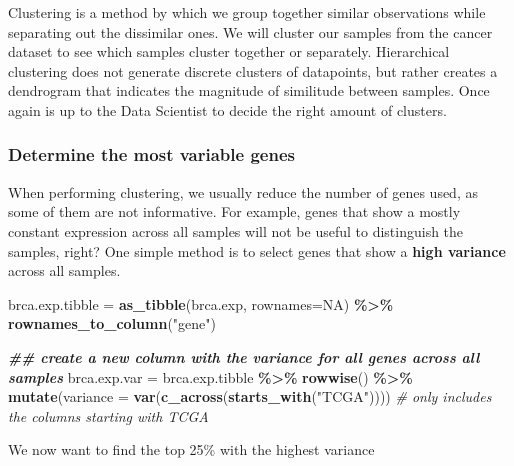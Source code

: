 \documentclass[
]{book}
\newenvironment{Shaded}{\begin{snugshade}}{\end{snugshade}}
\newcommand{\AttributeTok}[1]{\textcolor[rgb]{0.13,0.29,0.53}{#1}}
\newcommand{\CommentTok}[1]{\textcolor[rgb]{0.56,0.35,0.01}{\textit{#1}}}
\newcommand{\ConstantTok}[1]{\textcolor[rgb]{0.56,0.35,0.01}{#1}}
\newcommand{\DocumentationTok}[1]{\textcolor[rgb]{0.56,0.35,0.01}{\textbf{\textit{#1}}}}
\newcommand{\FloatTok}[1]{\textcolor[rgb]{0.00,0.00,0.81}{#1}}
\newcommand{\FunctionTok}[1]{\textcolor[rgb]{0.13,0.29,0.53}{\textbf{#1}}}
\newcommand{\NormalTok}[1]{#1}
\newcommand{\OtherTok}[1]{\textcolor[rgb]{0.56,0.35,0.01}{#1}}
\newcommand{\SpecialCharTok}[1]{\textcolor[rgb]{0.81,0.36,0.00}{\textbf{#1}}}
\newcommand{\StringTok}[1]{\textcolor[rgb]{0.31,0.60,0.02}{#1}}
\begin{document}
Clustering is a method by which we group together similar observations while separating out the dissimilar ones. We will cluster our samples from the cancer dataset to see which samples cluster together or separately. Hierarchical clustering does not generate discrete clusters of datapoints, but rather creates a dendrogram that indicates the magnitude of similitude between samples. Once again is up to the Data Scientist to decide the right amount of clusters.

\hypertarget{determine-the-most-variable-genes}{%
\subsubsection{Determine the most variable genes}\label{determine-the-most-variable-genes}}

When performing clustering, we usually reduce the number of genes used, as some of them are not informative. For example, genes that show a mostly constant expression across all samples will not be useful to distinguish the samples, right? One simple method is to select genes that show a \textbf{high variance} across all samples.

\begin{Shaded}
\begin{Highlighting}[]
\NormalTok{brca.exp.tibble }\OtherTok{=} \FunctionTok{as\_tibble}\NormalTok{(brca.exp, }\AttributeTok{rownames=}\ConstantTok{NA}\NormalTok{) }\SpecialCharTok{\%\textgreater{}\%}
  \FunctionTok{rownames\_to\_column}\NormalTok{(}\StringTok{"gene"}\NormalTok{)}

\DocumentationTok{\#\# create a new column with the variance for all genes across all samples}
\NormalTok{brca.exp.var }\OtherTok{=}\NormalTok{ brca.exp.tibble }\SpecialCharTok{\%\textgreater{}\%}
  \FunctionTok{rowwise}\NormalTok{() }\SpecialCharTok{\%\textgreater{}\%}
  \FunctionTok{mutate}\NormalTok{(}\AttributeTok{variance =} \FunctionTok{var}\NormalTok{(}\FunctionTok{c\_across}\NormalTok{(}\FunctionTok{starts\_with}\NormalTok{(}\StringTok{"TCGA"}\NormalTok{)))) }
\CommentTok{\# only includes the columns starting with TCGA}
\end{Highlighting}
\end{Shaded}

We now want to find the top 25\% with the highest variance

\begin{Shaded}
\end{Shaded}
\end{document}
